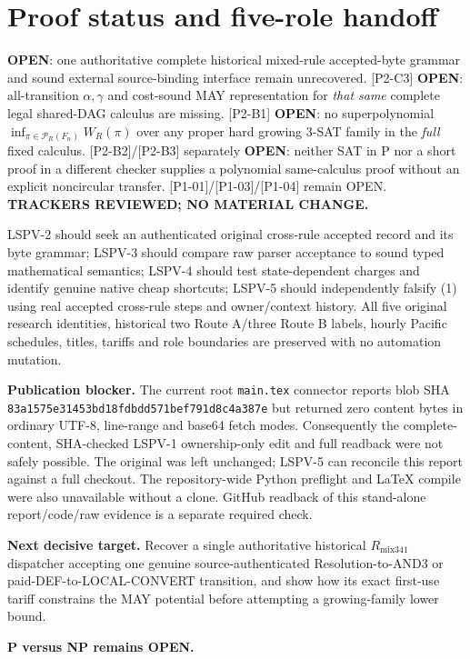 \documentclass[11pt]{article}
\begin{document}
\section*{Proof status and five-role handoff}
\noindent [P2-D1] \textbf{OPEN}: one authoritative complete historical
mixed-rule accepted-byte grammar and sound external source-binding
interface remain unrecovered. [P2-C3] \textbf{OPEN}:
all-transition \(\alpha,\gamma\) and cost-sound MAY representation
for \emph{that same} complete legal shared-DAG calculus are missing.
[P2-B1] \textbf{OPEN}: no superpolynomial
\(\inf_{\pi\in\mathcal{P}_{R}(F_n)}W_R(\pi)\) over any
proper hard growing 3-SAT family in the \emph{full} fixed calculus.
[P2-B2]/[P2-B3] separately \textbf{OPEN}: neither SAT in P nor
a short proof in a different checker supplies a polynomial
same-calculus proof without an explicit noncircular transfer.
[P1-01]/[P1-03]/[P1-04] remain OPEN.
\textbf{TRACKERS REVIEWED; NO MATERIAL CHANGE.}

LSPV-2 should seek an authenticated original cross-rule accepted
record and its byte grammar; LSPV-3 should compare raw parser
acceptance to sound typed mathematical semantics; LSPV-4 should test
state-dependent charges and identify genuine native cheap shortcuts;
LSPV-5 should independently falsify (1) using real accepted
cross-rule steps and owner/context history. All five original
research identities, historical two Route A/three Route B
labels, hourly Pacific schedules, titles, tariffs and role
boundaries are preserved with no automation mutation.

\noindent\textbf{Publication blocker.} The current root
\texttt{main.tex} connector reports blob SHA
\texttt{83a1575e31453bd18fdbdd571bef791d8c4a387e}
but returned zero content bytes in ordinary UTF-8, line-range
and base64 fetch modes. Consequently the complete-content,
SHA-checked LSPV-1 ownership-only edit and full readback were
not safely possible. The original was left unchanged; LSPV-5
can reconcile this report against a full checkout. The
repository-wide Python preflight and LaTeX compile were also
unavailable without a clone. GitHub readback of this stand-alone
report/code/raw evidence is a separate required check.

\noindent\textbf{Next decisive target.}
Recover a single authoritative historical \(R_{\mathrm{mix341}}\)
dispatcher accepting one genuine source-authenticated
Resolution-to-AND3 or paid-DEF-to-LOCAL-CONVERT transition, and
show how its exact first-use tariff constrains the MAY potential
before attempting a growing-family lower bound.

\noindent\textbf{P versus NP remains OPEN.}
\end{document}

